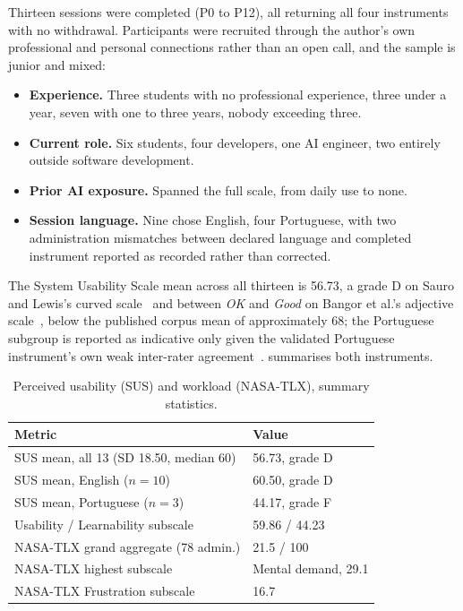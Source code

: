 \documentclass[sigconf,review=false]{acmart}
\begin{document}
Thirteen sessions were completed (P0 to P12), all returning all four instruments with no withdrawal. Participants were recruited through the author's own professional and personal connections rather than an open call, and the sample is junior and mixed:

\begin{itemize}[leftmargin=0.5cm,itemsep=0.2em]
\item \textbf{Experience.} Three students with no professional experience, three under a year, seven with one to three years, nobody exceeding three.
\item \textbf{Current role.} Six students, four developers, one AI engineer, two entirely outside software development.
\item \textbf{Prior AI exposure.} Spanned the full scale, from daily use to none.
\item \textbf{Session language.} Nine chose English, four Portuguese, with two administration mismatches between declared language and completed instrument reported as recorded rather than corrected.
\end{itemize}

The System Usability Scale mean across all thirteen is 56.73, a grade D on Sauro and Lewis's curved scale~\cite{Sauro:2016QUANT} and between \emph{OK} and \emph{Good} on Bangor et al.'s adjective scale~\cite{Bangor:2009SUS}, below the published corpus mean of approximately 68; the Portuguese subgroup is reported as indicative only given the validated Portuguese instrument's own weak inter-rater agreement~\cite{Martins:2015SUS}.  summarises both instruments.

\begin{table}[H]
\centering
\caption{Perceived usability (SUS) and workload (NASA-TLX), summary statistics.}
\label{tab:sus_tlx}
\footnotesize
\begin{tabular}{@{}p{4.3cm}p{3.2cm}@{}}
\toprule
\textbf{Metric} & \textbf{Value} \\
\midrule
SUS mean, all 13 (SD 18.50, median 60) & 56.73, grade D \\
SUS mean, English ($n{=}10$) & 60.50, grade D \\
SUS mean, Portuguese ($n{=}3$) & 44.17, grade F \\
Usability / Learnability subscale & 59.86 / 44.23 \\
NASA-TLX grand aggregate (78 admin.) & 21.5 / 100 \\
NASA-TLX highest subscale & Mental demand, 29.1 \\
NASA-TLX Frustration subscale & 16.7 \\
\bottomrule
\end{tabular}
\end{table}
\end{document}
